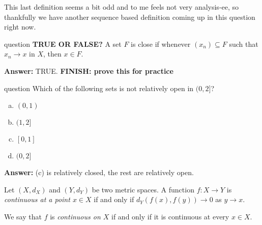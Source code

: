 \documentclass[class=article, crop=false]{standalone}
\begin{document}
This last definition seems a bit odd and to me feels not very analysis-ee, so thankfully we have another sequence based definition coming up in this question right now.

\begin{understandingcheck}{question}
  \textbf{TRUE OR FALSE?} A set $F$ is close if whenever $(x_n) \subseteq F$ such that $x_n \to x$ in $X$, then $x \in F$.

  \textbf{Answer:} TRUE. \textbf{FINISH: prove this for practice}
\end{understandingcheck}

\begin{understandingcheck}{question}
  Which of the following sets is not relatively open in $(0,2]$? \begin{enumerate}[(a)]
    \item $(0,1)$
    \item $(1,2]$
    \item $[0,1]$
    \item $(0,2]$
  \end{enumerate}

  \textbf{Answer:} (c) is relatively closed, the rest are relatively open.
\end{understandingcheck}

\begin{defn}
  Let $(X,d_X)$ and $(Y,d_Y)$ be two metric spaces. A function $f\colon X\to Y$ is \emph{continuous at a point $x \in X$} if and only if $d_Y(f(x), f(y)) \to 0$ as $y \to x$.

  We say that $f$ is \emph{continuous on $X$} if and only if it is continuous at every $x \in X$.
\end{defn}
\end{document}

